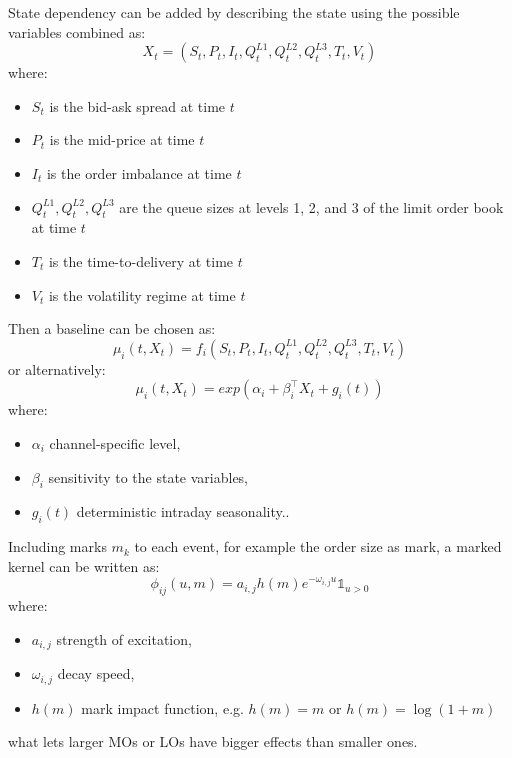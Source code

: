 \documentclass[12pt,a4paper]{cau_thesis}
\begin{document}
State dependency can be added by describing the state using the
possible variables combined as:
\begin{equation}
    X_{t} = (S_{t}, P_{t}, I_{t}, Q_{t}^{L1}, Q_{t}^{L2}, Q_{t}^{L3}, T_{t}, V_{t})
\end{equation}
where:
\begin{itemize}
    \item $S_{t}$ is the bid-ask spread at time $t$
    \item $P_{t}$ is the mid-price at time $t$
    \item $I_{t}$ is the order imbalance at time $t$
    \item $Q_{t}^{L1}, Q_{t}^{L2}, Q_{t}^{L3}$ are the queue sizes at levels 1, 2, and 3 of the limit order book at time $t$
    \item $T_{t}$ is the time-to-delivery at time $t$
    \item $V_{t}$ is the volatility regime at time $t$
\end{itemize}

Then a baseline can be chosen as:
\begin{equation}
    \mu_{i}(t, X_{t}) = f_{i}(S_{t}, P_{t}, I_{t}, Q_{t}^{L1}, Q_{t}^{L2}, Q_{t}^{L3}, T_{t}, V_{t})
\end{equation}
or alternatively:
\begin{equation}
    \mu_{i}(t, X_{t}) = exp(\alpha_{i} + \beta_{i}^{\top}X_{t}+g_{i}(t))
\end{equation}
where:
\begin{itemize}
    \item $\alpha_{i}$ channel-specific level,
    \item $\beta_{i}$ sensitivity to the state variables,
    \item $g_{i}(t)$ deterministic intraday seasonality..
\end{itemize}

Including marks $m_{k}$ to each event, for example the order size as
mark, a marked kernel can be written as:
\begin{equation}
    \phi_{ij}(u, m) = a_{i, j} h(m) e^{-\omega_{i, j} u} \mathbb{1}_{u > 0}
\end{equation}
where:
\begin{itemize}
    \item $a_{i, j}$ strength of excitation,
    \item $\omega_{i, j}$ decay speed,
    \item $h(m)$ mark impact function, e.g. $h(m) = m$ or $h(m) = \log(1+m)$
\end{itemize}
what lets larger MOs or LOs have bigger effects than smaller ones.
\end{document}
